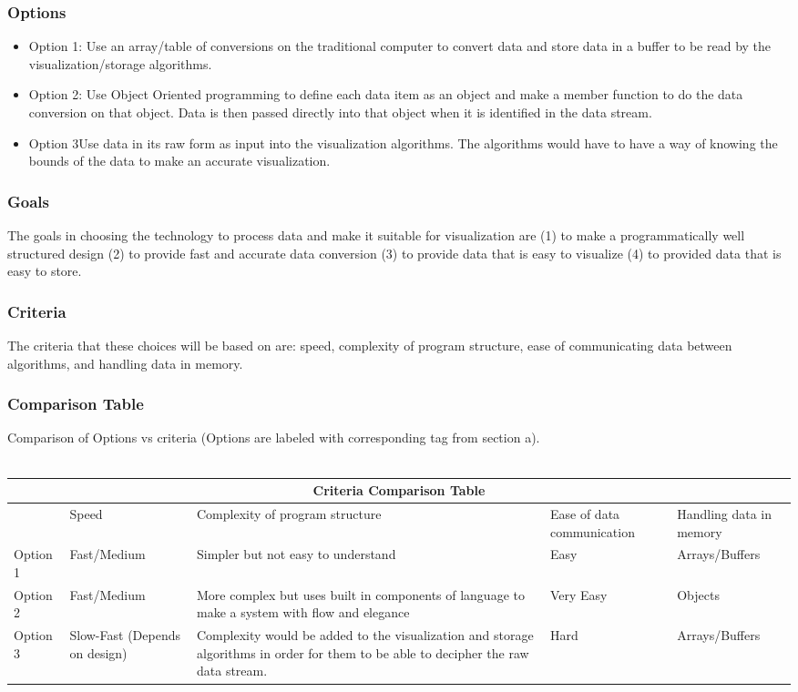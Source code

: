 \documentclass[10pt,draftclsnofoot,onecolumn]{IEEEtran}
\begin{document}
\subsubsection{Options}
\begin{itemize}
	\item Option 1: Use an array/table of conversions on the traditional computer to convert data and store data in a buffer to be read by the visualization/storage algorithms. 
	\item Option 2: Use Object Oriented programming to define each data item as an object and make a member function to do the data conversion on that object. Data is then passed directly into that object when it is identified in the data stream.
	\item Option 3Use data in its raw form as input into the visualization algorithms. The algorithms would have to have a way of knowing the bounds of the data to make an accurate visualization. \\
	\end{itemize}
\subsubsection{Goals}
The goals in choosing the technology to process data and make it suitable for visualization are (1) to make a programmatically well structured design (2) to provide fast and accurate data conversion (3) to provide data that is easy to visualize (4) to provided data that is easy to store.\\
\subsubsection{Criteria}
The criteria that these choices will be based on are: speed, complexity of program structure, ease of communicating data between algorithms, and handling data in memory.\\
\subsubsection{Comparison Table}
Comparison of Options vs criteria (Options are labeled with corresponding tag from section a). \\ \\

\begin{tabular}{ |p{2cm}|p{2cm}|p{2cm}| p{2cm}|p{2cm}|  }
\hline
\multicolumn{5}{|c|}{Criteria Comparison Table} \\
\hline
   &Speed&Complexity of program structure&Ease of data communication&Handling data in memory\\
\hline
Option 1&Fast/Medium&Simpler but not easy to understand&Easy&Arrays/Buffers\\
\hline
Option 2&Fast/Medium&More complex but uses built in components of language to make a system with flow and elegance&Very Easy&Objects\\
\hline
Option 3&Slow-Fast (Depends on design) &Complexity would be added to the visualization and storage algorithms in order for them to be able to decipher the raw data stream.&Hard&Arrays/Buffers \\
\hline
\end{tabular}
\vspace{1cm}
\end{document}
